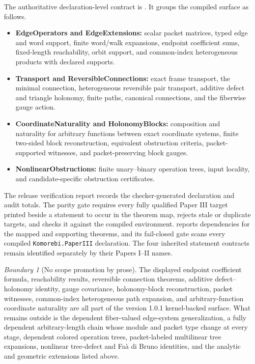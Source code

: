 \documentclass[11pt,a4paper]{article}
\theoremstyle{plain}
\theoremstyle{definition}
\theoremstyle{remark}
\newtheorem{boundary}[boundary]{Boundary}
\newcommand{\leanname}[1]{\nolinkurl{#1}}
\begin{document}
The authoritative declaration-level contract is
.  It groups the compiled
surface as follows.
\begin{itemize}
\item \textbf{EdgeOperators and EdgeExtensions:} scalar packet matrices,
typed edge and word support, finite word/walk expansions, endpoint coefficient
sums, fixed-length reachability, orbit support, and common-index
heterogeneous products with declared supports.
\item \textbf{Transport and ReversibleConnections:} exact frame transport,
the minimal connection, heterogeneous reversible pair transport, additive
defect and triangle holonomy, finite paths, canonical connections, and the
fiberwise gauge action.
\item \textbf{CoordinateNaturality and HolonomyBlocks:} composition and
naturality for arbitrary functions between exact coordinate systems, finite
two-sided block reconstruction, equivalent obstruction criteria,
packet-supported witnesses, and packet-preserving block gauges.
\item \textbf{NonlinearObstructions:} finite unary--binary operation trees,
input locality, and candidate-specific obstruction certificates.
\end{itemize}
The release verification report records the checker-generated declaration
and audit totals.  The parity gate requires every fully qualified Paper III
target printed beside a statement to occur in the theorem map, rejects stale
or duplicate targets, and checks it against the compiled environment.
 reports dependencies for the mapped and supporting
theorems, and its fail-closed gate scans every compiled
\leanname{Komorebi.PaperIII} declaration.  The four inherited statement
contracts remain identified separately by their Papers I--II names.

\begin{boundary}[No scope promotion by prose]
The displayed endpoint coefficient formula, reachability results, reversible
connection theorems, additive defect--holonomy identity, gauge covariance,
holonomy-block reconstruction, packet witnesses, common-index heterogeneous
path expansion, and arbitrary-function coordinate naturality are all part of
the version 1.0.1 kernel-backed surface.  What remains outside is the
dependent fiber-valued edge-system generalization, a fully dependent
arbitrary-length chain whose module and packet type change at every stage,
dependent colored operation trees, packet-labeled multilinear tree
expansions, nonlinear tree-defect and Fa\`a di Bruno identities, and the
analytic and geometric extensions listed above.
\end{boundary}
\end{document}

